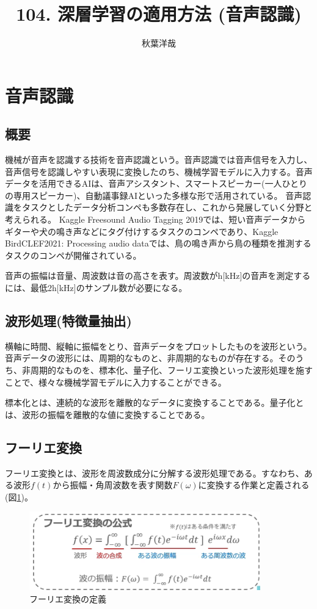 \documentclass{ltjsarticle}
\begin{document}
\title{104. 深層学習の適用方法 (音声認識)}
\author{秋葉洋哉}
\maketitle

\section{音声認識}
\subsection{概要}
機械が音声を認識する技術を音声認識という。音声認識では音声信号を入力し、音声信号を認識しやすい表現に変換したのち、機械学習モデルに入力する。音声データを活用できるAIは、音声アシスタント、スマートスピーカー(一人ひとりの専用スピーカー)、自動議事録AIといった多様な形で活用されている。
音声認識をタスクとしたデータ分析コンペも多数存在し、これから発展していく分野と考えられる。
Kaggle Freesound Audio Tagging 2019では、短い音声データからギターや犬の鳴き声などにタグ付けするタスクのコンペであり、Kaggle BirdCLEF2021: Processing audio dataでは、鳥の鳴き声から鳥の種類を推測するタスクのコンペが開催されている。
\par
音声の振幅は音量、周波数は音の高さを表す。周波数がh[kHz]の音声を測定するには、最低2h[kHz]のサンプル数が必要になる。

\subsection{波形処理(特徴量抽出)}
横軸に時間、縦軸に振幅をとり、音声データをプロットしたものを波形という。音声データの波形には、周期的なものと、非周期的なものが存在する。そのうち、非周期的なものを、標本化、量子化、フーリエ変換といった波形処理を施すことで、様々な機械学習モデルに入力することができる。
\par
標本化とは、連続的な波形を離散的なデータに変換することである。量子化とは、波形の振幅を離散的な値に変換することである。

\subsection{フーリエ変換}
フーリエ変換とは、波形を周波数成分に分解する波形処理である。すなわち、ある波形$f(t)$から振幅・角周波数を表す関数$F(\omega)$に変換する作業と定義される(図\ref{fig:Fourier})。
\begin{figure}[htbp]
  \centering
  \includegraphics[width=10cm]{./capture/Fourier_def.png}
  \caption{フーリエ変換の定義}
  \label{fig:Fourier}
\end{figure}
\end{document}
